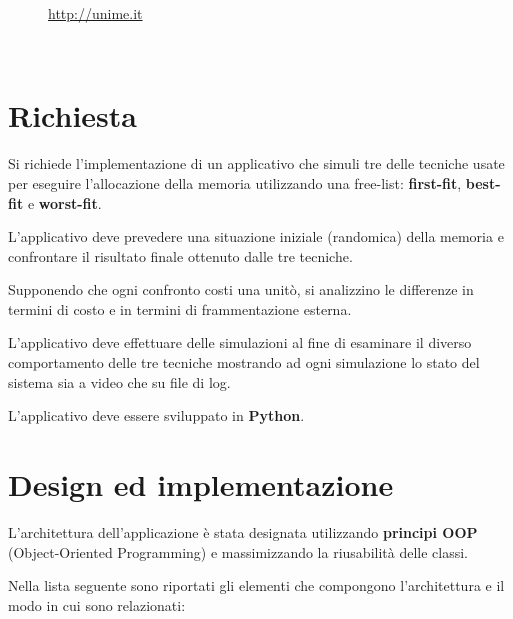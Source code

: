 \documentclass[12pt]{report}
\renewcommand\emph{\textbf}
\begin{document}
\begin{titlepage}
\begin{minipage}{\linewidth}
\begin{minipage}{0.35\linewidth}
\begin{figure}[H]
                    \url{http://unime.it}
                \end{figure}
            \end{minipage}
        \end{minipage}\\[3cm]
    \end{titlepage}

    \newcommand{\atoc}[1]{\addtocontents{toc}{#1\par}}
    \renewcommand{\thesection}{\arabic{section}.}
    \tableofcontents
    \newpage

    \section{Richiesta}
        Si richiede l’implementazione di un applicativo che simuli tre delle tecniche usate per eseguire l’allocazione della memoria utilizzando una free-list: \emph{first-fit}, \emph{best-fit} e \emph{worst-fit}. 

        L’applicativo deve prevedere una situazione iniziale (randomica) della memoria e confrontare il risultato finale ottenuto dalle tre tecniche. 

        Supponendo che ogni confronto costi una unitò, si analizzino le differenze in termini di costo e in termini di frammentazione esterna.         

        L’applicativo deve effettuare delle simulazioni al fine di esaminare il diverso comportamento delle tre tecniche mostrando ad ogni simulazione lo stato del sistema sia a video che su file di log.

        L’applicativo deve essere sviluppato in \emph{Python}.

    \section{Design ed implementazione}
        L'architettura dell'applicazione è stata designata utilizzando \emph{principi OOP} (Object-Oriented Programming) e massimizzando la riusabilità delle classi.

        Nella lista seguente sono riportati gli elementi che compongono l'architettura e il modo in cui sono relazionati:
\end{document}

